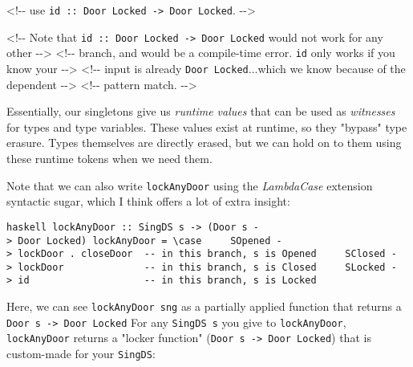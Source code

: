 \documentclass[]{article}
\begin{document}
\begin{itemize}
  \textless{}!-\/- use
  \texttt{id\ ::\ Door\ \textquotesingle{}Locked\ -\textgreater{}\ Door\ \textquotesingle{}Locked}.
  -\/-\textgreater{}

  \textless{}!-\/- Note that
  \texttt{id\ ::\ Door\ \textquotesingle{}Locked\ -\textgreater{}\ Door\ \textquotesingle{}Locked}
  would not work for any other -\/-\textgreater{} \textless{}!-\/- branch, and
  would be a compile-time error. \texttt{id} only works if you know your
  -\/-\textgreater{} \textless{}!-\/- input is already
  \texttt{Door\ \textquotesingle{}Locked}...which we know because of the
  dependent -\/-\textgreater{} \textless{}!-\/- pattern match.
  -\/-\textgreater{}
\end{itemize}

Essentially, our singletons give us \emph{runtime values} that can be used as
\emph{witnesses} for types and type variables. These values exist at runtime, so
they "bypass" type erasure. Types themselves are directly erased, but we can
hold on to them using these runtime tokens when we need them.

Note that we can also write \texttt{lockAnyDoor} using the \emph{LambdaCase}
extension syntactic sugar, which I think offers a lot of extra insight:

\texttt{haskell\ lockAnyDoor\ ::\ SingDS\ s\ -\textgreater{}\ (Door\ s\ -\textgreater{}\ Door\ \textquotesingle{}Locked)\ lockAnyDoor\ =\ \textbackslash{}case\ \ \ \ \ SOpened\ -\textgreater{}\ lockDoor\ .\ closeDoor\ \ -\/-\ in\ this\ branch,\ s\ is\ \textquotesingle{}Opened\ \ \ \ \ SClosed\ -\textgreater{}\ lockDoor\ \ \ \ \ \ \ \ \ \ \ \ \ \ -\/-\ in\ this\ branch,\ s\ is\ \textquotesingle{}Closed\ \ \ \ \ SLocked\ -\textgreater{}\ id\ \ \ \ \ \ \ \ \ \ \ \ \ \ \ \ \ \ \ \ -\/-\ in\ this\ branch,\ s\ is\ \textquotesingle{}Locked}

Here, we can see \texttt{lockAnyDoor\ sng} as a partially applied function that
returns a \texttt{Door\ s\ -\textgreater{}\ Door\ \textquotesingle{}Locked} For
any \texttt{SingDS\ s} you give to \texttt{lockAnyDoor}, \texttt{lockAnyDoor}
returns a "locker function"
(\texttt{Door\ s\ -\textgreater{}\ Door\ \textquotesingle{}Locked}) that is
custom-made for your \texttt{SingDS}:
\end{document}
